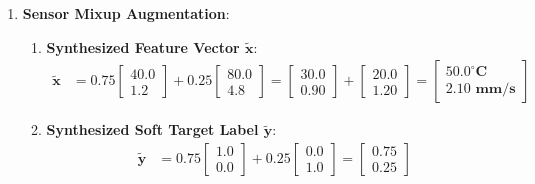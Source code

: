 \begin{enumerate}
\begin{enumerate}[label=(\alph*)]
        \item \textbf{Probable Implementation Errors for $\mathcal{L} = 12.40$}:
        \begin{enumerate}
            \item \textbf{Double Softmax Bug}: The model architecture applies an explicit \texttt{nn.Softmax()} layer at the output, which is subsequently passed to \texttt{nn.CrossEntropyLoss()} (which applies a second log-softmax internally), driving probabilities into near-zero territory.
            \item \textbf{Exploding Weight Initialization}: The final layer weights were initialized with an excessively large variance, generating huge initial pre-activation logits ($|z| > 50$) that cause extreme cross-entropy penalties.
        \end{enumerate}
    \end{enumerate}

    \item \textbf{Sensor Mixup Augmentation}:
    \begin{enumerate}[label=(\alph*)]
        \item \textbf{Synthesized Feature Vector $\tilde{\mathbf{x}}$}:
        \begin{align*}
        \tilde{\mathbf{x}} &= 0.75 \begin{bmatrix} 40.0 \\ 1.2 \end{bmatrix} + 0.25 \begin{bmatrix} 80.0 \\ 4.8 \end{bmatrix} = \begin{bmatrix} 30.0 \\ 0.90 \end{bmatrix} + \begin{bmatrix} 20.0 \\ 1.20 \end{bmatrix} = \begin{bmatrix} \mathbf{50.0^\circ\text{C}} \\ \mathbf{2.10\text{ mm/s}} \end{bmatrix}
        \end{align*}

        \item \textbf{Synthesized Soft Target Label $\tilde{\mathbf{y}}$}:
        \begin{align*}
        \tilde{\mathbf{y}} &= 0.75 \begin{bmatrix} 1.0 \\ 0.0 \end{bmatrix} + 0.25 \begin{bmatrix} 0.0 \\ 1.0 \end{bmatrix} = \begin{bmatrix} \mathbf{0.75} \\ \mathbf{0.25} \end{bmatrix}
        \end{align*}


\end{enumerate}
\end{enumerate}
